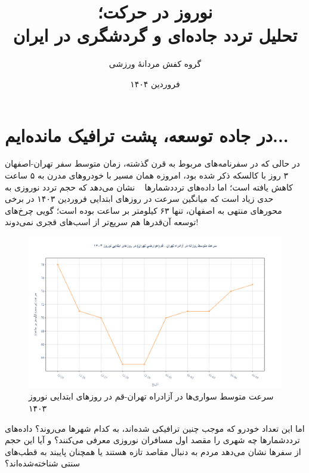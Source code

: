\documentclass[a4paper, 12pt]{article}
\begin{document}
\title{نوروز در حرکت؛\\ تحلیل تردد جاده‌ای و گردشگری در ایران}
\author{گروه کفش مردانهٔ ورزشی}
\date{فروردین ۱۴۰۴}
\maketitle

\section{در جاده توسعه، پشت ترافیک مانده‌ایم...}
در حالی که در سفرنامه‌های مربوط به قرن گذشته، زمان متوسط سفر تهران-اصفهان ۳ روز با کالسکه ذکر شده بود، امروزه همان مسیر با خودروهای مدرن به ۵ ساعت کاهش یافته است؛ اما داده‌های ترددشمارها
~\cite{rahdari}
نشان می‌دهد که حجم تردد نوروزی به حدی زیاد است که میانگین 
 سرعت در روزهای ابتدایی فروردین ۱۴۰۳ در برخی محورهای منتهی به اصفهان، تنها ۶۳ کیلومتر بر ساعت بوده است؛ گویی چرخ‌های توسعه آن‌قدرها هم سریع‌تر از اسب‌های قجری نمی‌دوند!

\begin{figure}[htbp]
    \centering
    \includegraphics[width=1\textwidth]{pics/intro/first_part.png}
    \caption{سرعت متوسط سواری‌ها در آزادراه تهران-قم در روزهای ابتدایی نوروز ۱۴۰۳}
\end{figure}

اما این تعداد خودرو که موجب چنین ترافیکی شده‌اند، به کدام شهرها می‌روند؟ داده‌های ترددشمارها چه شهری را مقصد اول مسافران نوروزی معرفی می‌کنند؟ و آیا این حجم از سفرها نشان می‌دهد مردم به دنبال مقاصد تازه هستند یا همچنان پایبند به قطب‌های سنتی شناخته‌شده‌اند؟
\end{document}
